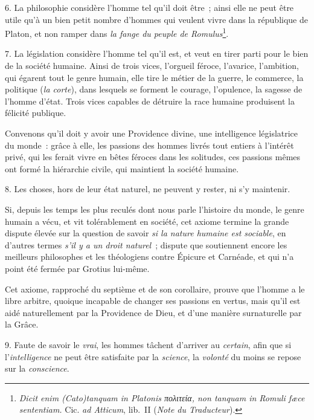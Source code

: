 \documentclass[french,twoside]{book} %
\begin{document}
\par
 6. La philosophie considère l’homme tel qu’il doit être ; ainsi elle ne peut être utile qu’à un bien petit nombre d’hommes qui veulent vivre dans la république de Platon, et non ramper dans \emph{{\itshape la fange du peuple de Romulus}}\footnote{\emph{{\itshape Dicit enim} (Cato){\itshape  tanquam in Platonis} πολιτεία{\itshape , non tanquam in Romuli fæce sententiam.}} Cic. {\itshape ad Atticum}, lib. II ({\itshape Note du Traducteur}).}.\par
7. La législation considère l’homme tel qu’il est, et veut en tirer parti pour le bien de la société humaine. Ainsi de trois vices, l’orgueil féroce, l’avarice, l’ambition, qui égarent tout le genre humain, elle tire le métier de la guerre, le commerce, la politique ({\itshape la corte}), dans lesquels se forment le courage, l’opulence, la sagesse de l’homme d’état. Trois vices capables de détruire la race humaine produisent la félicité publique.\par
Convenons qu’il doit y avoir une Providence divine, une intelligence législatrice du monde : grâce à elle, les passions des hommes livrés tout entiers à l’intérêt privé, qui les ferait vivre en bêtes féroces dans les solitudes, ces passions mêmes ont formé la hiérarchie civile, qui maintient la société humaine.\par
8. Les choses, hors de leur état naturel, ne peuvent y rester, ni s’y maintenir.\par
 Si, depuis les temps les plus reculés dont nous parle l’histoire du monde, le genre humain a vécu, et vit tolérablement en société, cet axiome termine la grande dispute élevée sur la question de savoir {\itshape si la nature humaine est sociable}, en d’autres termes {\itshape s’il y a un droit naturel} ; dispute que soutiennent encore les meilleurs philosophes et les théologiens contre Épicure et Carnéade, et qui n’a point été fermée par Grotius lui-même.\par
Cet axiome, rapproché du septième et de son corollaire, prouve que l’homme a le libre arbitre, quoique incapable de changer ses passions en vertus, mais qu’il est aidé naturellement par la Providence de Dieu, et d’une manière surnaturelle par la Grâce.\par
9. Faute de savoir le {\itshape vrai}, les hommes tâchent d’arriver au {\itshape certain}, afin que si l’{\itshape intelligence} ne peut être satisfaite par la {\itshape science}, la {\itshape volonté} du moins se repose sur la {\itshape conscience}.\par
\end{document}
